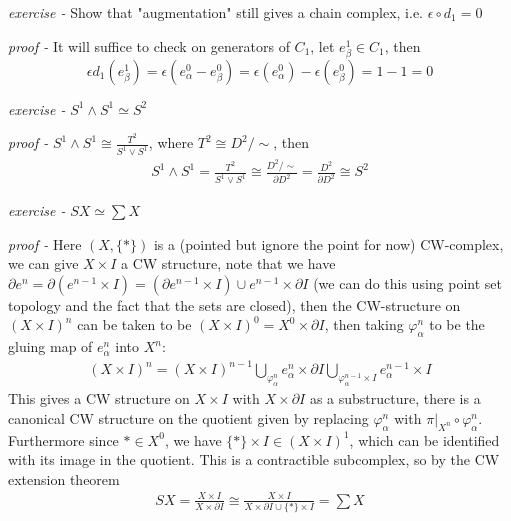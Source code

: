 \documentclass[11pt]{article}
\theoremstyle{definition}
\newcommand{\set}[1]{\{#1\}}
\begin{document}
    \emph{exercise - }\label{HEx6} Show that "augmentation" still gives a chain complex, i.e. \(\epsilon\circ d_1 = 0\)

    \emph{proof - } It will suffice to check on generators of \(C_1\), let \(e^1_\beta \in C_1\), then 
    \[\epsilon d_1(e^1_\beta) = \epsilon (e_\alpha^0 - e_{\beta}^0) = \epsilon(e_\alpha^0) - \epsilon(e_\beta^0) = 1-1 = 0\]


    \emph{exercise - }\label{HEx7} \(S^1 \wedge S^1 \simeq S^2\)

    \emph{proof - } \(S^1 \wedge S^1 \cong \frac{T^2}{S^1 \vee S^1}\), where \(T^2 \cong D^2/\sim\), then
    \begin{align*}
        S^1 \wedge S^1 = \frac{T^2}{S^1 \vee S^1} \cong \frac{D^2/\sim}{\partial D^2} = \frac{D^2}{\partial D^2} \cong S^2
    \end{align*}


    \emph{exercise - }\label{HEx8} \(SX \simeq \sum X\)

    \emph{proof - } Here \((X,\set{*})\) is a (pointed but ignore the point for now) CW-complex, we can give \(X \times I\) a CW structure, note that we have \(\partial e^n = \partial(e^{n-1} \times I) = (\partial e^{n-1} \times I)\cup e^{n-1} \times \partial I\)
    (we can do this using point set topology and the fact that the sets are closed), then the CW-structure on \((X \times I)^n\) can be taken to be \((X \times I)^0 = X^0 \times \partial I\), then taking \(\varphi_\alpha^n\) to be the gluing map of \(e_\alpha^{n}\) into \(X^n\):
    \begin{align*}
        (X \times I)^n = (X \times I)^{n-1} \bigcup_{\varphi_\alpha^n} e_\alpha^n \times \partial I \bigcup_{\varphi_\alpha^{n-1} \times I} e_\alpha^{n-1} \times I
    \end{align*}
    This gives a CW structure on \(X \times I\) with \(X \times \partial I\) as a substructure, there is a canonical CW structure on the quotient given by replacing \(\varphi_\alpha^n\) with \(\pi\vert_{X^n} \circ\varphi_\alpha^n\). Furthermore since \(* \in X^0\), we have \(\set{*} \times I \in (X \times I)^1\), which can be identified with its image in the quotient. This is a contractible subcomplex, so by the CW extension theorem
    \begin{align*}
        SX = \frac{X \times I}{X \times \partial I} \cong \frac{X \times I}{X \times \partial I \cup \set{*} \times I} = \sum X
    \end{align*}
    
\end{document}
